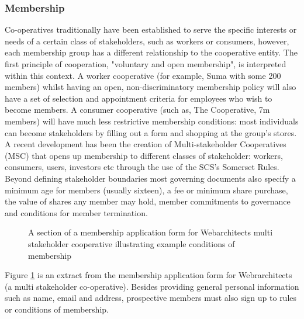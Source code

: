 \subsubsection{Membership}
Co-operatives traditionally have been established to serve the specific interests or needs of a certain class of stakeholders, such as workers or consumers, however, each membership group has a different relationship to the cooperative entity. The first principle of cooperation, "voluntary and open membership", is interpreted within this context. A worker cooperative (for example, Suma\cite{Suma} with some 200 members) whilst having an open, non-discriminatory membership policy will also have a set of selection and appointment criteria for employees who wish to become members.  A consumer cooperative (such as, The Cooperative\cite{TheCoop}, 7m members) will have much less restrictive membership conditions: most individuals can become stakeholders by filling out a form and shopping at the group's stores.  A recent development has been the creation of Multi-stakeholder Cooperatives (MSC) that opens up membership to different classes of stakeholder: workers, consumers, users, investors etc through the use of the SCS's Somerset Rules.\\

Beyond defining stakeholder boundaries most governing documents also specify a minimum age for members (usually sixteen), a fee or minimum share purchase, the value of shares any member may hold, member commitments to governance and conditions for member termination.\\

\begin{figure}
\centering
{}
\decoRule
\caption[]{A section of a membership application form for Webarchitects multi stakeholder cooperative illustrating example conditions of membership}
\label{fig:webarchForm}
\end{figure} 
Figure \ref{fig:webarchForm} is an extract from the membership application form for Webrarchitects\cite{webarchitects} (a multi stakeholder co-operative). Besides providing general personal information such as name, email and address, prospective members must also sign up to rules or conditions of membership.\\

